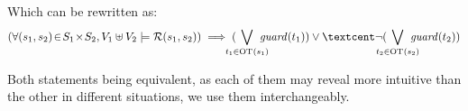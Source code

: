 \documentclass[runningheads]{llncs}
\begin{document}
Which can be rewritten as:
\[
\left(
\forall \mpar{s_1, s_2} \!\in\! S_1 \!\times\! S_2, V_1 \uplus V_2  \models \mathcal{R}\mpar{s_1, s_2}\right) \implies( \bigvee_\subbox{t_1 \in \fOT{s_1}} \fguard{t_1} ) \lor¢ \lnot( \bigvee_\subbox{t_2 \in \fOT{s_2}} \fguard{t_2}  )
\]

Both statements being equivalent, as each of them may reveal more intuitive than the other in different situations, we  use them interchangeably.
%
%
\end{document}
